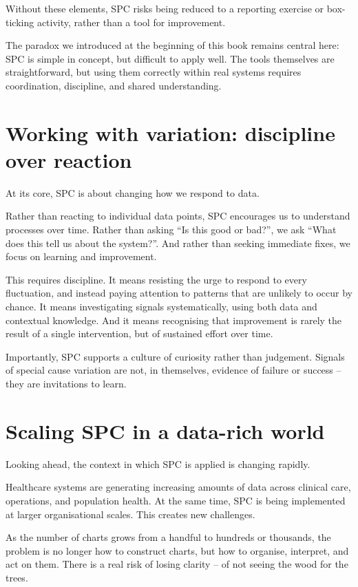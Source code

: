 \documentclass[
]{book}
\begin{document}
Without these elements, SPC risks being reduced to a reporting exercise or box-ticking activity, rather than a tool for improvement.

The paradox we introduced at the beginning of this book remains central here: SPC is simple in concept, but difficult to apply well. The tools themselves are straightforward, but using them correctly within real systems requires coordination, discipline, and shared understanding.

\section{Working with variation: discipline over reaction}\label{working-with-variation-discipline-over-reaction}

At its core, SPC is about changing how we respond to data.

Rather than reacting to individual data points, SPC encourages us to understand processes over time. Rather than asking ``Is this good or bad?'', we ask ``What does this tell us about the system?''. And rather than seeking immediate fixes, we focus on learning and improvement.

This requires discipline. It means resisting the urge to respond to every fluctuation, and instead paying attention to patterns that are unlikely to occur by chance. It means investigating signals systematically, using both data and contextual knowledge. And it means recognising that improvement is rarely the result of a single intervention, but of sustained effort over time.

Importantly, SPC supports a culture of curiosity rather than judgement. Signals of special cause variation are not, in themselves, evidence of failure or success -- they are invitations to learn.

\section{Scaling SPC in a data-rich world}\label{scaling-spc-in-a-data-rich-world}

Looking ahead, the context in which SPC is applied is changing rapidly.

Healthcare systems are generating increasing amounts of data across clinical care, operations, and population health. At the same time, SPC is being implemented at larger organisational scales. This creates new challenges.

As the number of charts grows from a handful to hundreds or thousands, the problem is no longer how to construct charts, but how to organise, interpret, and act on them. There is a real risk of losing clarity -- of not seeing the wood for the trees.
\end{document}
